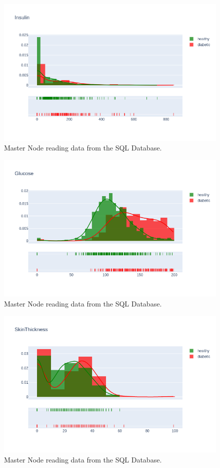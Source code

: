 \documentclass[12pt]{article}
\begin{document}
\begin{figure}[ht]
\centering
\includegraphics[width=1\textwidth]{newplot(4).png}
\caption{Master Node reading data from the SQL Database.}
\end{figure}

\begin{figure}[ht]
\centering
\includegraphics[width=1\textwidth]{newplot(5).png}
\caption{Master Node reading data from the SQL Database.}
\end{figure}

\begin{figure}[ht]
\centering
\includegraphics[width=1\textwidth]{newplot(6).png}
\caption{Master Node reading data from the SQL Database.}
\end{figure}
\end{document}
